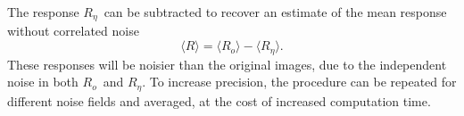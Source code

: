 \documentclass[usegraphicx,usenatbib]{mn2e}
\newcommand{\mcalR}{$R$}
\newcommand{\mcalRo}{$R_o$}
\newcommand{\mcalRnoise}{$R_\eta$}
\begin{document}
The response \mcalRnoise\ can be subtracted to recover an estimate of the mean
response without correlated noise
\begin{equation}
    \langle \mbox{\mcalR} \rangle = \langle \mbox{\mcalRo} \rangle - \langle \mbox{\mcalRnoise} \rangle.
\end{equation}
These responses will be noisier than the original images, due to the
independent noise in both \mcalRo\ and \mcalRnoise.  To increase
precision, the procedure can be repeated for different noise fields
and averaged, at the cost of increased computation time.




\end{document}
